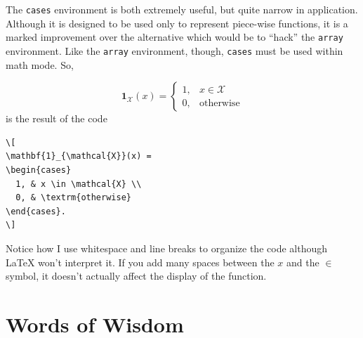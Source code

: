 The \texttt{cases} environment is both extremely useful, but quite
narrow in application. Although it is designed to be used only to
represent piece-wise functions, it is a marked improvement over the
alternative which would be to ``hack'' the \texttt{array}
environment. Like the \texttt{array} environment, though,
\texttt{cases} must be used within math mode. So,

\[
\mathbf{1}_{\mathcal{X}}(x) =
\begin{cases}
  1, & x \in \mathcal{X} \\
  0, & \textrm{otherwise}
\end{cases}
\]
is the result of the code

\begin{lstlisting}
\[
\mathbf{1}_{\mathcal{X}}(x) =
\begin{cases}
  1, & x \in \mathcal{X} \\
  0, & \textrm{otherwise}
\end{cases}.
\]
\end{lstlisting}

Notice how I use whitespace and line breaks to organize the code although
\LaTeX{} won't interpret it. If you add many spaces between the $x$ and the
$\in$ symbol, it doesn't actually affect the display of the function.

\section{Words of Wisdom}

